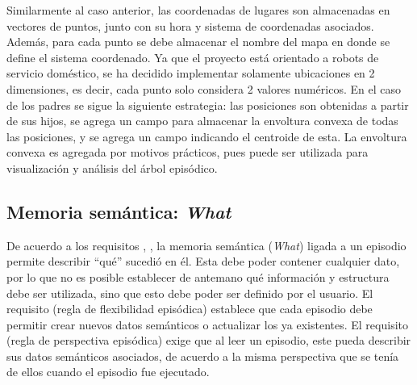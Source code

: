 Similarmente al caso anterior, las coordenadas de lugares son almacenadas en vectores de puntos, junto con su hora y sistema de coordenadas asociados. Además, para cada punto se debe almacenar el nombre del mapa en donde se define el sistema coordenado. Ya que el proyecto está orientado a robots de servicio doméstico, se ha decidido implementar solamente ubicaciones en 2 dimensiones, es decir, cada punto solo considera 2 valores numéricos. En el caso de los padres se sigue la siguiente estrategia: las posiciones son obtenidas a partir de sus hijos, se agrega un campo para almacenar la envoltura convexa de todas las posiciones, y se agrega un campo indicando el centroide de esta. La envoltura convexa es agregada por motivos prácticos, pues puede ser utilizada para visualización y análisis del árbol episódico.



\subsection{Memoria semántica: \textit{What}}\label{sec:design_ep_what}

De acuerdo a los requisitos , , la memoria semántica (\textit{What}) ligada a un episodio permite describir ``qué'' sucedió en él. Esta debe poder  contener cualquier dato, por lo que no es posible establecer de antemano qué información y estructura debe ser utilizada, sino que esto debe poder ser definido por el usuario. El requisito  (regla de flexibilidad episódica) establece que cada episodio debe permitir crear nuevos datos semánticos o actualizar los ya existentes. El requisito  (regla de perspectiva episódica) exige que al leer un episodio, este pueda describir sus datos semánticos asociados, de acuerdo a la misma perspectiva que se tenía de ellos cuando el episodio fue ejecutado.


